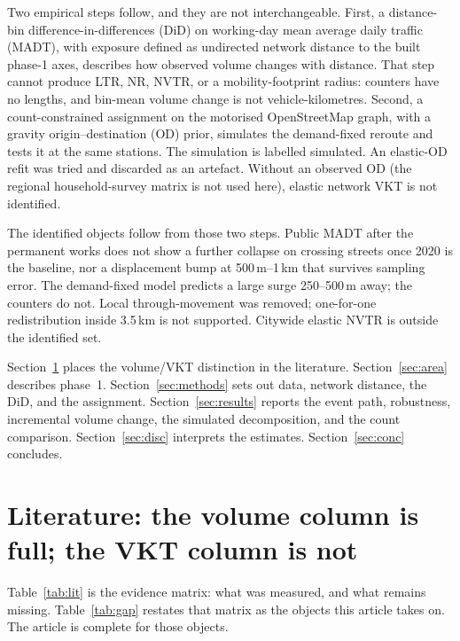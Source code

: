\documentclass[a4paper,fleqn]{cas-dc}
\begin{document}
Two empirical steps follow, and they are not interchangeable. First, a
distance-bin difference-in-differences (DiD) on working-day mean average daily
traffic (MADT), with exposure defined as undirected network distance to the
built phase-1 axes, describes how observed volume changes with distance. That
step cannot produce LTR, NR, NVTR, or a mobility-footprint radius: counters
have no lengths, and bin-mean volume change is not vehicle-kilometres. Second,
a count-constrained assignment on the motorised OpenStreetMap graph, with a
gravity origin--destination (OD) prior, simulates the demand-fixed reroute and
tests it at the same stations. The simulation is labelled simulated. An
elastic-OD refit was tried and discarded as an artefact. Without an observed
OD (the regional household-survey matrix is not used here), elastic network
VKT is not identified.

The identified objects follow from those two steps. Public MADT after the
permanent works does not show a further collapse on crossing streets once
2020 is the baseline, nor a displacement bump at 500\,m--1\,km that survives
sampling error. The demand-fixed model predicts a large surge 250--500\,m
away; the counters do not. Local through-movement was removed; one-for-one
redistribution inside 3.5\,km is not supported. Citywide elastic NVTR is
outside the identified set.

Section~\ref{sec:lit} places the volume/VKT distinction in the literature.
Section~\ref{sec:area} describes phase~1. Section~\ref{sec:methods} sets out
data, network distance, the DiD, and the assignment. Section~\ref{sec:results}
reports the event path, robustness, incremental volume change, the simulated
decomposition, and the count comparison. Section~\ref{sec:disc} interprets
the estimates. Section~\ref{sec:conc} concludes.

\section{Literature: the volume column is full; the VKT column is not}
\label{sec:lit}

Table~\ref{tab:lit} is the evidence matrix: what was measured, and what remains
missing. Table~\ref{tab:gap} restates that matrix as the objects this article
takes on. The article is complete for those objects.
\end{document}

